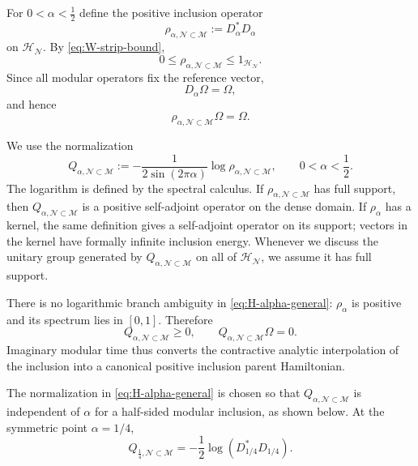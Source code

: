 \documentclass[a4paper,11pt]{article}
\theoremstyle{definition}
\newcommand{\mN}{\mathcal{N}}
\newcommand{\mH}{\mathcal{H}}
\newcommand{\mM}{\mathcal{M}}
\begin{document}
For $0<\alpha<\frac12$ define the positive inclusion operator
\begin{equation}
    \boxed{
    \rho_{\alpha,\mN\subset\mM}
    :=
    D_\alpha^*D_\alpha
    }
    \label{eq:rho-alpha-general}
\end{equation}
on $\mH_{\mN}$. By \eqref{eq:W-strip-bound},
\begin{equation}
    0\leq
    \rho_{\alpha,\mN\subset\mM}
    \leq
    1_{\mH_{\mN}}.
    \label{eq:rho-alpha-contraction}
\end{equation}
Since all modular operators fix the reference vector,
\begin{equation}
    D_\alpha\Omega=\Omega,
\end{equation}
and hence
\begin{equation}
    \boxed{
    \rho_{\alpha,\mN\subset\mM}\Omega=\Omega .
    }
    \label{eq:rho-alpha-vacuum}
\end{equation}

We use the normalization
\begin{equation}
    \boxed{
    Q_{\alpha,\mN\subset\mM}
    :=
    -\frac{1}{2\sin(2\pi\alpha)}
    \log
    \rho_{\alpha,\mN\subset\mM},
    \qquad
    0<\alpha<\frac12 .
    }
    \label{eq:H-alpha-general}
\end{equation}
The logarithm is defined by the spectral calculus. If
$\rho_{\alpha,\mN\subset\mM}$ has full support, then
$Q_{\alpha,\mN\subset\mM}$ is a positive self-adjoint operator on the dense
domain. If $\rho_\alpha$ has a kernel, the same definition gives a self-adjoint
operator on its support; vectors in the kernel have formally infinite
inclusion energy. Whenever we discuss the unitary group generated by
$Q_{\alpha,\mN\subset\mM}$ on all of $\mH_{\mN}$, we assume it has full support. 

There is no logarithmic branch ambiguity in
\eqref{eq:H-alpha-general}: $\rho_\alpha$ is positive and its spectrum lies
in $[0,1]$. Therefore
\begin{equation}
    \boxed{
    Q_{\alpha,\mN\subset\mM}\geq0,
    \qquad
    Q_{\alpha,\mN\subset\mM}\Omega=0.
    }
    \label{eq:H-alpha-positive}
\end{equation}
Imaginary modular time thus converts the contractive analytic interpolation
of the inclusion into a canonical positive inclusion parent Hamiltonian.

The normalization in \eqref{eq:H-alpha-general} is chosen so that
$Q_{\alpha,\mN\subset\mM}$ is independent of $\alpha$ for a half-sided
modular inclusion, as shown below. At the symmetric point $\alpha=1/4$,
\begin{equation}
    Q_{\frac14,\mN\subset\mM}
    =
    -\frac12
    \log\left(D_{1/4}^*D_{1/4}\right).
    \label{eq:H-quarter}
\end{equation}
\end{document}

